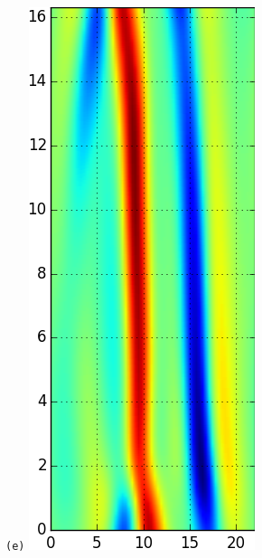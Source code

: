 \documentclass[final,leqno,onefignum,onetabnum]{siamltexmm}
\begin{document}
\begin{figure}[h]
\begin{minipage}{.115\textwidth}
  \end{minipage}
  \begin{minipage}{.115\textwidth}
    \centering \small{\texttt{(e)}}
    \includegraphics[width=\textwidth]{rpo1Fv1_64}

\end{minipage}
\end{figure}
\end{document}
